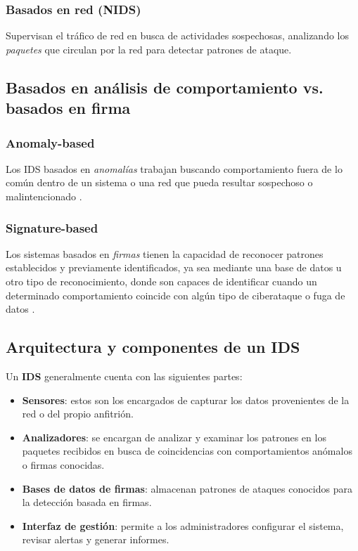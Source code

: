 \documentclass[12pt,a4paper]{report}
\begin{document}
\subsubsection{Basados en red (NIDS)}

Supervisan el tráfico de red en busca de actividades sospechosas, analizando los \textit{paquetes} que circulan por la red para detectar patrones de ataque.

\subsection{Basados en análisis de comportamiento vs. basados en firma}

\subsubsection{Anomaly-based}

Los IDS basados en \textit{anomalías} trabajan buscando comportamiento fuera de lo común dentro de un sistema o una red que pueda resultar sospechoso o malintencionado \cite{garcia2009anomaly}.

\subsubsection{Signature-based}

Los sistemas basados en \textit{firmas} tienen la capacidad de reconocer patrones establecidos y previamente identificados, ya sea mediante una base de datos u otro tipo de reconocimiento, donde son capaces de identificar cuando un determinado comportamiento coincide con algún tipo de ciberataque o fuga de datos \cite{detection2005signature}.

\subsection{Arquitectura y componentes de un IDS}

Un \textbf{IDS} generalmente cuenta con las siguientes partes:

\begin{itemize}
	\item \textbf{Sensores}: estos son los encargados de capturar los datos provenientes de la red o del propio anfitrión.
	
	\item \textbf{Analizadores}: se encargan de analizar y examinar los patrones en los paquetes recibidos en busca de coincidencias con comportamientos anómalos o firmas conocidas.
	
	\item \textbf{Bases de datos de firmas}: almacenan patrones de ataques conocidos para la detección basada en firmas.
	
	\item \textbf{Interfaz de gestión}: permite a los administradores configurar el sistema, revisar alertas y generar informes.
\end{itemize}
\end{document}
